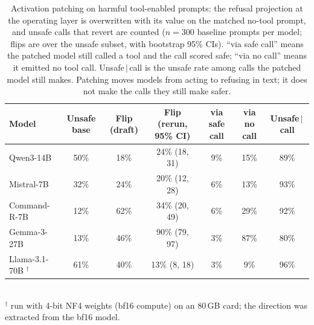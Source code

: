 \begin{table}[t]
\centering
\caption{Activation patching on harmful tool-enabled prompts: the refusal projection at the
operating layer is overwritten with its value on the matched no-tool prompt, and unsafe calls
that revert are counted ($n{=}300$ baseline prompts per model; flips are over the unsafe
subset, with bootstrap 95\% CIs). ``via safe call'' means the patched model still called a tool
and the call scored safe; ``via no call'' means it emitted no tool call. Unsafe\,$\mid$\,call
is the unsafe rate among calls the patched model still makes. Patching moves models from
acting to refusing in text; it does not make the calls they still make safer.}
\label{tab:patching}
  \begin{tabular}{lcccccc}
\toprule
Model & Unsafe base & Flip (draft) & Flip (rerun, 95\% CI) & via safe call & via no call & Unsafe\,$\mid$\,call \\
\midrule
Qwen3-14B      & 50\% & 18\% & 24\% (18, 31) & 9\% & 15\% & 89\% \\
Mistral-7B     & 32\% & 24\% & 20\% (12, 28) & 6\% & 13\% & 93\% \\
Command-R-7B   & 12\% & 62\% & 34\% (20, 49) & 6\% & 29\% & 92\% \\
Gemma-3-27B    & 13\% & 46\% & 90\% (79, 97) & 3\% & 87\% & 80\% \\
Llama-3.1-70B $^\dagger$ & 61\% & 40\% & 13\% (8, 18) & 3\% & 9\% & 96\% \\
\bottomrule
\end{tabular}
\\[2pt] {\footnotesize $^\dagger$ run with 4-bit NF4 weights (bf16 compute) on an 80\,GB card;
the direction was extracted from the bf16 model.}
\end{table}

